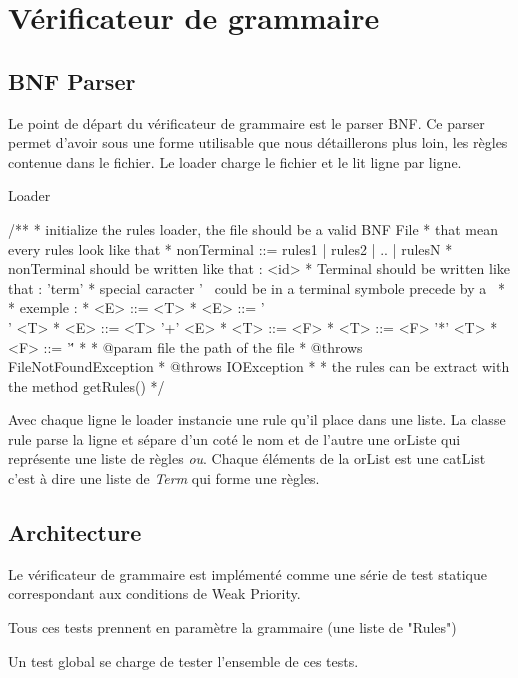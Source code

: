 \section{Vérificateur de grammaire}
	\subsection{BNF Parser}
	Le point de départ du vérificateur de grammaire est le parser BNF. Ce parser permet d'avoir sous une forme utilisable que nous détaillerons 
plus loin, les règles contenue dans le fichier. Le loader charge le fichier et le lit ligne par ligne.

Loader
\begin{verbatim*}
	/**
	 * initialize the rules loader, the file should be a valid BNF File
	 * that mean every rules look like that
	 * nonTerminal ::= rules1 | rules2 | .. | rulesN
	 * nonTerminal should be written like that : <id>
	 * Terminal should be written like that : 'term'
	 * special caracter  ' \ could be in a terminal symbole precede by a \
	 * 
	 * exemple : 
	 * <E> ::= <T> 
	 * <E> ::= '\\' <T> 
	 * <E> ::= <T> '+' <E>
	 * <T> ::= <F>
	 * <T> ::= <F> '*' <T> 
	 * <F> ::= '\''
	 *  
	 * @param file the path of the file
	 * @throws FileNotFoundException
	 * @throws IOException
	 * 
	 * the rules can be extract with the method getRules()
	 */
\end{verbatim*}

Avec chaque ligne le loader instancie une rule qu'il place dans une liste. La classe rule parse la ligne et sépare d'un coté le nom et de l'autre
une orListe qui représente une liste de règles \textit{ou}. Chaque éléments de la orList est une catList c'est à dire une liste de \textit{Term} qui forme une règles.

	\subsection{Architecture}
	Le vérificateur de grammaire est implémenté comme une série de test
	statique correspondant aux conditions de Weak Priority.
	
	Tous ces tests prennent en paramètre la grammaire (une liste de "Rules")

	Un test global se charge de tester l'ensemble de ces tests.

